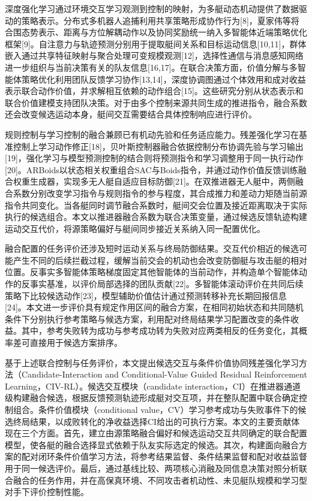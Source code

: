 \documentclass[UTF8,a4paper,zihao=5,fontset=none]{ctexart}
\begin{document}
深度强化学习通过环境交互学习观测到控制的映射，为多艇动态机动提供了数据驱动的策略表示。分布式多机器人追捕利用共享策略形成协作行为{[}8{]}，夏家伟等将合围态势表示、距离与方位解耦动作以及协同奖励统一纳入多智能体近端策略优化框架{[}9{]}。自注意力与轨迹预测分别用于提取艇间关系和目标运动信息{[}10,11{]}，群体嵌入通过共享特征映射与聚合处理可变规模观测{[}12{]}，选择性通信与消息感知网络进一步组织与当前决策有关的队友信息{[}16,17{]}。在联合决策方面，价值分解与多智能体策略优化利用团队反馈学习协作{[}13,14{]}，深度协调图通过个体效用和成对收益表示联合动作价值，并求解相互依赖的动作组合{[}15{]}。这些研究分别从状态表示和联合价值建模支持团队决策。对于由多个控制来源共同生成的推进指令，融合系数还会改变候选运动本身，艇间交互需要结合具体控制响应进行评价。

规则控制与学习控制的融合兼顾已有机动先验和任务适应能力。残差强化学习在基准控制上学习动作修正{[}18{]}，贝叶斯控制器融合依据控制分布协调先验与学习输出{[}19{]}，强化学习与模型预测控制的结合则将预测指令和学习调整用于同一执行动作{[}20{]}。ARBoids以状态相关权重组合SAC与Boids指令，并通过动作价值反馈训练融合权重生成器，实现多无人艇自适应目标防御{[}21{]}。在双推进器无人艇中，两侧融合系数分别改变学习指令与规则指令的参与程度，其合成推力和差动力矩随当前源指令共同变化。当各艇同时调节融合系数时，艇间交会位置及接近距离取决于实际执行的候选组合。本文以推进器融合系数为联合决策变量，通过候选反馈轨迹构建运动交互代价，将源策略偏好与艇间同步接近关系纳入同一配置优化。

融合配置的任务评价还涉及短时运动关系与终局防御结果。交互代价相近的候选可能产生不同的后续拦截过程，缓解当前交会的机动也会改变防御艇与攻击艇的相对位置。反事实多智能体策略梯度固定其他智能体的当前动作，并构造单个智能体动作的反事实基准，以评价局部选择的团队贡献{[}22{]}。多智能体滚动评价在共同后续策略下比较候选动作{[}23{]}，模型辅助价值估计通过预测转移补充长期回报信息{[}24{]}。本文进一步评价具有规定作用区间的融合方案，在相同初始状态和共同随机条件下分别执行参考策略与候选方案，利用配对终局结果学习配置改变的条件收益。其中，参考失败转为成功与参考成功转为失败对应两类相反的任务变化，其概率差可直接用于候选方案排序。

基于上述联合控制与任务评价，本文提出候选交互与条件价值协同残差强化学习方法（Candidate-Interaction and Conditional-Value Guided Residual Reinforcement Learning，CIV-RL）。候选交互模块（candidate interaction，CI）在推进器通道级构建融合候选，根据反馈预测轨迹形成艇对交互项，并在整队配置中联合确定控制组合。条件价值模块（conditional value，CV）学习参考成功与失败事件下的候选终局结果，以成败转化的净收益选择CI给出的可执行方案。本文的主要贡献体现在三个方面。首先，建立由源策略融合偏好和候选运动交互共同确定的联合配置模型，使各艇的融合选择显式依赖于队友实际选定的候选。其次，构建面向融合方案的配对闭环条件价值学习方法，将参考结果监督、条件结果监督和配对收益监督用于同一候选评价。最后，通过基线比较、两项核心消融及同信息决策对照分析联合融合的任务作用，并在高保真环境、不同攻击者机动性、未见艇队规模和学习型对手下评价控制性能。
\end{document}
